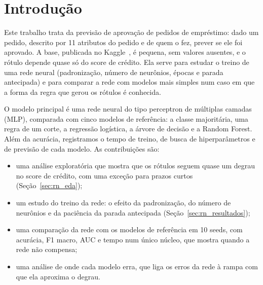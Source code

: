 \section{Introdução}

Este trabalho trata da previsão de aprovação de pedidos de empréstimo: dado um pedido, descrito por 11 atributos do pedido e de quem o fez, prever se ele foi aprovado. A base, publicada no Kaggle~\cite{kaggle:loan}, é pequena, sem valores ausentes, e o rótulo depende quase só do score de crédito. Ela serve para estudar o treino de uma rede neural (padronização, número de neurônios, épocas e parada antecipada) e para comparar a rede com modelos mais simples num caso em que a forma da regra que gerou os rótulos é conhecida.

O modelo principal é uma rede neural do tipo perceptron de múltiplas camadas (MLP), comparada com cinco modelos de referência: a classe majoritária, uma regra de um corte, a regressão logística, a árvore de decisão e a Random Forest. Além da acurácia, registramos o tempo de treino, de busca de hiperparâmetros e de previsão de cada modelo. As contribuições são:
\begin{itemize}
  \item uma análise exploratória que mostra que os rótulos seguem quase um degrau no score de crédito, com uma exceção para prazos curtos (Seção~\ref{sec:rn_eda});
  \item um estudo do treino da rede: o efeito da padronização, do número de neurônios e da paciência da parada antecipada (Seção~\ref{sec:rn_resultados});
  \item uma comparação da rede com os modelos de referência em 10 seeds, com acurácia, F1 macro, AUC e tempo num único núcleo, que mostra quando a rede não compensa;
  \item uma análise de onde cada modelo erra, que liga os erros da rede à rampa com que ela aproxima o degrau.
\end{itemize}
